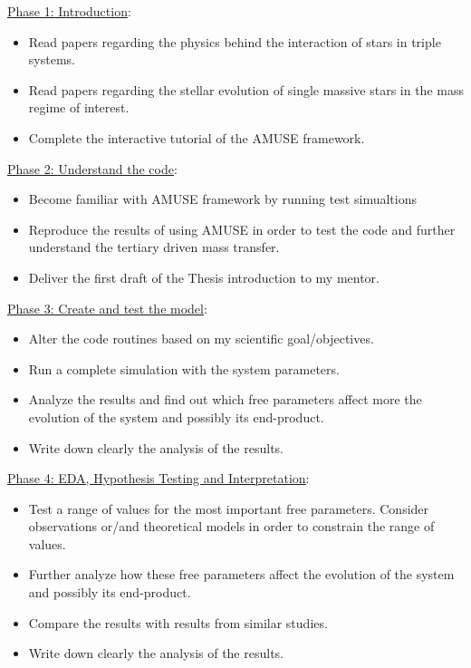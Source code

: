 \documentclass{uva-inf-article}
\numberwithin{equation}{section}
\begin{document}
\underline{Phase 1: Introduction}:
\begin{itemize}
    \item Read papers regarding the physics behind the interaction of stars in triple systems.
    \item Read papers regarding the stellar evolution of single massive stars in the mass regime of interest. 
    \item Complete the interactive tutorial of the AMUSE framework.
\end{itemize}

\hspace*{-0.7cm}\underline{Phase 2: Understand the code}:
\begin{itemize}
    \item Become familiar with AMUSE framework by running test simualtions
    \item Reproduce the results of \citep{de2014evolution} using AMUSE in order to test the code and further understand the tertiary driven mass transfer.
    \item Deliver the first draft of the Thesis introduction to my mentor.
\end{itemize}

\hspace*{-0.7cm}\underline{Phase 3: Create and test the model}:
\begin{itemize}
    \item Alter the code routines based on my scientific goal/objectives.
    \item  Run a complete simulation with the system parameters.
    \item  Analyze the results and find out which free parameters affect more the evolution of the system and possibly its end-product.
    \item Write down clearly the analysis of the results.
\end{itemize}

\hspace*{-0.7cm}\underline{Phase 4: EDA, Hypothesis Testing and Interpretation}:
\begin{itemize}
    \item Test a range of values for the most important free parameters. Consider observations or/and theoretical models in order to constrain the range of values.
    \item Further analyze how these free parameters affect the evolution of the system and possibly its end-product.
    \item Compare the results with results from similar studies.
    \item  Write down clearly the analysis of the results.
\end{itemize}
\end{document}
